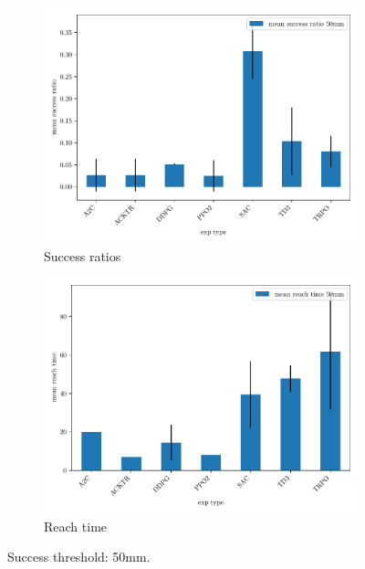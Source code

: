 \documentclass{article}
\begin{document}
\begin{figure}[H]
\centering
\begin{subfigure}{0.49\textwidth}
  \centering
  \includegraphics[width=\textwidth]{../success_50mm.pdf}
  \caption{Success ratios} 
\end{subfigure}
\begin{subfigure}{0.49\textwidth}
  \centering
  \includegraphics[width=\textwidth]{../reachtime_50mm.pdf} 
  \caption{Reach time}
\end{subfigure}
\caption{Success threshold: 50mm.}
\end{figure}
\end{document}
